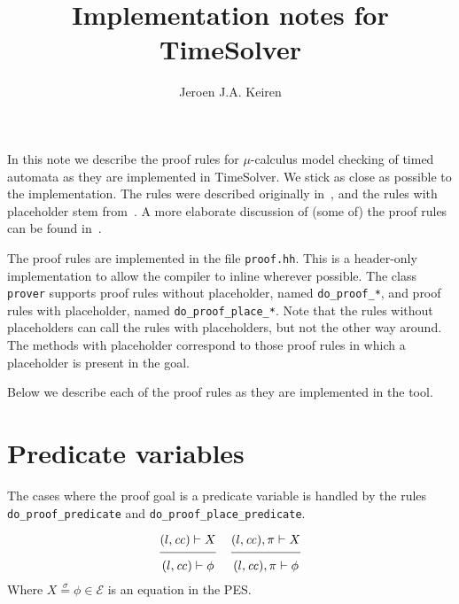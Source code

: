 \documentclass{article}
\title{Implementation notes for TimeSolver}
\author{Jeroen J.A. Keiren}
\newcommand{\proofrule}[3][]{#1 \frac{\raisebox{.7ex}{\normalsize{$#2$}}}
  {\raisebox{-1.0ex}{\normalsize{$#3$}}}}
\newcommand{\E}{\mathcal{E}}
\newcommand{\eqsigma}{\stackrel{\sigma}{=}}
\newcommand{\placeholder}[1][]{\pi_{#1}}
\newcommand{\loc}{l}
\newcommand{\region}{\mathit{cc}}
\begin{document}
\maketitle

In this note we describe the proof rules for $\mu$-calculus model checking of
timed automata as they are implemented in TimeSolver. We stick as close as
possible to the implementation. The rules were described originally
in~\cite{ZC:05forte,ZC:05rtss,Zhang:05}, and the rules with placeholder stem from~\cite{FC:14}. A
more elaborate discussion of (some of) the proof rules can be found
in~\cite{FC:14report}.

The proof rules are implemented in the file \texttt{proof.hh}. This is a
header-only implementation to allow the compiler to inline wherever possible.
The class \texttt{prover} supports proof rules without placeholder, named
\texttt{do\_proof\_*}, and proof rules with placeholder, named
\texttt{do\_proof\_place\_*}. Note that the rules without placeholders can call
the rules with placeholders, but not the other way around. The methods with
placeholder correspond to those proof rules in which a placeholder is present in
the goal. 

Below we describe each of the proof rules as they are implemented in the tool.

\section{Predicate variables}
The cases where the proof goal is a predicate variable is handled by the rules
\texttt{do\_proof\_predicate} and \texttt{do\_proof\_place\_predicate}.

\[
\proofrule
{(\loc, \region) \vdash X}
{(\loc, \region) \vdash \phi}
%
\quad
%
\proofrule
{(\loc, \region), \placeholder \vdash X}
{(\loc, \region), \placeholder \vdash \phi}
\]
Where $X \eqsigma \phi \in \E$ is an equation in the PES.
\end{document}
